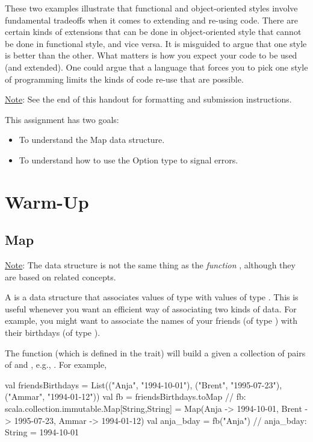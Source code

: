 \documentclass{book}
\begin{document}
These two examples illustrate that functional
and object-oriented styles involve fundamental tradeoffs when it comes
to extending and re-using code. There are certain kinds of extensions
that can be done in object-oriented style that cannot be done in
functional style, and vice versa.  It is misguided to argue that
one style is better than the other. What matters is how you expect your code
to be used (and extended). One could argue that a language that forces you to
pick one style of programming limits the kinds of code re-use that are possible.


\underline{Note}: See the end of this handout for formatting and submission instructions.

This assignment has two goals:

\begin{itemize}
  \item To understand the Map data structure.
  \item To understand how to use the Option type to signal errors.
\end{itemize}

\section{Warm-Up}

\subsection{Map}

\underline{Note}: The data structure  is not the same thing as the \emph{function} , although they are based on related concepts.

A  is a data structure that associates values of type  with values of type .  This is useful whenever you want an efficient way of associating two kinds of data.  For example, you might want to associate the names of your friends (of type ) with their birthdays (of type ).

The  function (which is defined in the  trait) will build a  given a collection of pairs of  and , e.g., .  For example,

\begin{scalacode}
val friendsBirthdays = List(("Anja", "1994-10-01"), ("Brent", "1995-07-23"), ("Ammar", "1994-01-12"))
val fb = friendsBirthdays.toMap
// fb: scala.collection.immutable.Map[String,String] = Map(Anja -> 1994-10-01, Brent -> 1995-07-23, Ammar -> 1994-01-12)
val anja_bday = fb("Anja")
// anja_bday: String = 1994-10-01
\end{scalacode}
\end{document}
